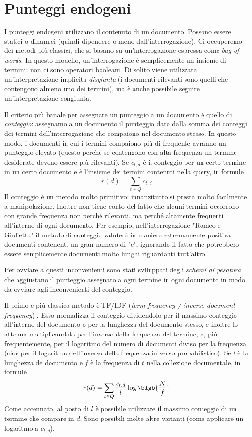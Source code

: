 \chapter{Punteggi endogeni}
I punteggi endogeni utilizzano il contenuto di un documento. Possono essere statici o dinamici (quindi dipendere o meno dall'interrogazione). Ci occuperemo dei metodi più classici, che si basano su un'interrogazione espressa come \textit{bag of words}. In questo modello, un'interrogazione è semplicemente un insieme di termini: non ci sono operatori booleani. Di solito viene utilizzata un'interpretazione implicita \textit{disgiunta} (i documenti rilevanti sono quelli che contengono almeno uno dei termini), ma è anche possibile seguire un'interpretazione congiunta.

Il criterio più banale per assegnare un punteggio a un documento è quello di \textit{conteggio}: assegnamo a un documento il punteggio dato dalla somma dei conteggi dei termini dell'interrogazione che compaiono nel documento stesso. In questo modo, i documenti in cui i termini compaiono più di frequente avranno un punteggio elevato (questo perché se contengono con alta frequenza un termine desiderato devono essere più rilevanti). Se $c_{t, d}$ è il conteggio per un certo termine in un certo documento e  è l'insieme dei termini contenuti nella query, in formule
\begin{equation}
	r(d) = \sum_{t \in Q}{c_{t, d}}
\end{equation}
Il conteggio è un metodo molto primitivo: innanzitutto si presta molto facilmente a manipolazione. Inoltre non tiene conto del fatto che alcuni termini occorrono con grande frequenza non perché rilevanti, ma perché altamente frequenti all'interno di ogni documento. Per esempio, nell'interrogazione "Romeo e Giulietta" il metodo di conteggio valuterà in maniera estremamente positiva documenti contenenti un gran numero di "e", ignorando il fatto che potrebbero essere semplicemente documenti molto lunghi riguardanti tutt'altro.

Per ovviare a questi inconvenienti sono stati sviluppati degli \textit{schemi di pesatura} che aggiustano il punteggio assegnato a ogni termine in ogni documento in modo da ovviare agli inconvenienti del conteggio.

Il primo e più classico metodo è TF/IDF (\textit{term frequency / inverse document frequency}) \cite{tfidf}. Esso normalizza il conteggio dividendolo per il massimo conteggio all'interno del documento o per la lunghezza del documento stesso, e inoltre lo attenua moltiplicandolo per l'inverso della frequenza del termine, o, più frequentemente, per il logaritmo del numero di documenti diviso per la frequenza (cioè per il logaritmo dell'inverso della frequenza in senso probabilistico). Se $l$ è la lunghezza de documento e $f$ è la frequenza di $t$ nella collezione documentale, in formule
\begin{equation}
	r(d) = \sum_{t \in Q} \frac{c_{t, d}}{l}\log\bigb{\frac{N}{f}}
\end{equation}
Come accennato, al posto di $l$ è possibile utilizzare il massimo conteggio di un termine che compare in $d$. Sono possibili molte altre varianti (come applicare un logaritmo a $c_{t, d}$).

